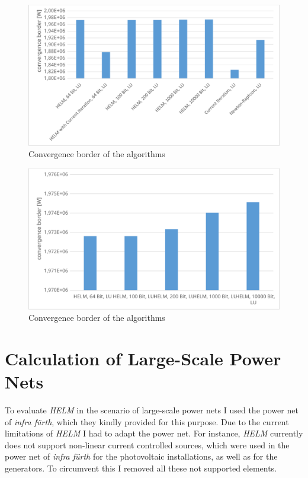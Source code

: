 \begin{figure}
	\centering
	\includegraphics[scale=0.7]{figures/convergence_border_vorstadtnetz_2}
	\caption[Comparison, convergence]{Convergence border of the algorithms}
	\label{fig:comparison_convergence_border_2}
\end{figure}

\begin{figure}
	\centering
	\includegraphics[scale=0.7]{figures/convergence_border_vorstadtnetz_3}
	\caption[Comparison, convergence]{Convergence border of the algorithms}
	\label{fig:comparison_convergence_border_3}
\end{figure}

\section{Calculation of Large-Scale Power Nets}
\label{sec:large_scale_power nets}
	
To evaluate \emph{HELM} in the scenario of large-scale power nets I used the power net of \emph{infra fürth}, which they kindly provided for this purpose. Due to the current limitations of \emph{HELM} I had to adapt the power net. For instance, \emph{HELM} currently does not support non-linear current controlled sources, which were used in the power net of \emph{infra fürth} for the photovoltaic installations, as well as for the generators. To circumvent this I removed all these not supported elements.

